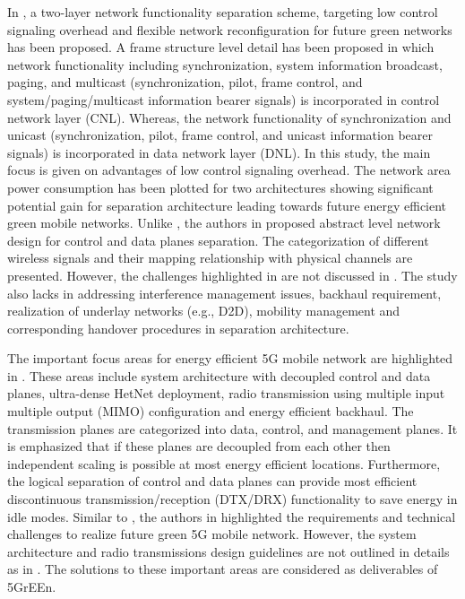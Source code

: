 \documentclass[article,10pt,twocolumn]{IEEEtran}
\begin{document}
In \citep{6515050}, a two-layer network functionality separation scheme, targeting low control signaling overhead and flexible network reconfiguration for future green networks has been proposed. A frame structure level detail has been proposed in which network functionality including synchronization, system information broadcast, paging, and multicast (synchronization, pilot, frame control, and system/paging/multicast information bearer signals) is incorporated in control network layer (CNL). Whereas, the network functionality of synchronization and unicast (synchronization, pilot, frame control, and unicast information bearer signals) is incorporated in data network layer (DNL). In this study, the main focus is given on advantages of low control signaling overhead. The network area power consumption has been plotted for two architectures showing significant potential gain for separation architecture leading towards future energy efficient green mobile networks. Unlike \citep{6152217}, the authors in \citep{6515050} proposed abstract level network design for control and data planes separation. The categorization of different wireless signals and their mapping relationship with physical channels are presented. However, the challenges highlighted in \citep{6152217} are not discussed in \citep{6515050}. The study also lacks in addressing interference management issues, backhaul requirement, realization of underlay networks (e.g., D2D), mobility management and corresponding handover procedures in separation architecture.

The important focus areas for energy efficient 5G mobile network are highlighted in \citep{6673363}. These areas include system architecture with decoupled control and data planes, ultra-dense HetNet deployment, radio transmission using multiple input multiple output (MIMO) configuration and energy efficient backhaul. The transmission planes are categorized into data, control, and management planes. It is emphasized that if these planes are decoupled from each other then independent scaling is possible at most energy efficient locations. Furthermore, the logical separation of control and data planes can provide most efficient discontinuous transmission/reception (DTX/DRX) functionality to save energy in idle modes. Similar to \citep{6152217}, the authors in \citep{6673363} highlighted the requirements and technical challenges to realize future green 5G mobile network. However, the system architecture and radio transmissions design guidelines are not outlined in details as in \citep{6515050}. The solutions to these important areas are considered as deliverables of 5GrEEn.
\end{document}
